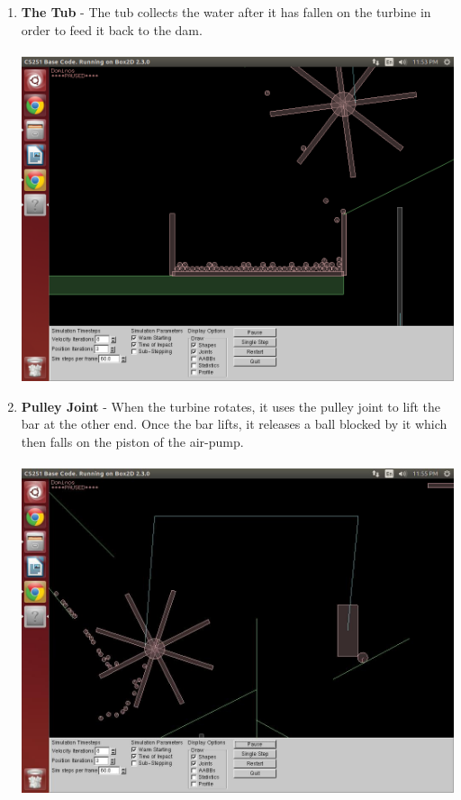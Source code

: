 \documentclass{report}
\begin{document}
\begin{enumerate}
\item \textbf{The Tub} - The tub collects the water after it has fallen on the turbine in order to feed it back to the dam.\\\\
\includegraphics[scale=0.25]{pics/Tub}
\item \textbf{Pulley Joint} - When the turbine rotates, it uses the pulley joint to lift the bar at the other end. Once the bar lifts, it releases a ball blocked by it which then falls on the piston of the air-pump.\\\\
\includegraphics[scale=0.25]{pics/PulleyJointTurbineBox}
\pagebreak


\end{enumerate}
\end{document}
